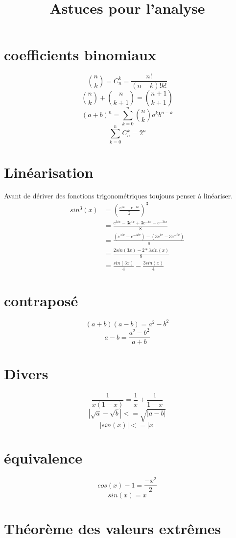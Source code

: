 \documentclass[a4paper,10pt]{article}
\title{Astuces pour l'analyse}
\author{}
\begin{document}
\maketitle

\begin{abstract}

\end{abstract}
\section{coefficients binomiaux}
\[\textstyle{n \choose k} = C^{k}_{n} = \frac{n!}{(n - k)!k!}\]
\[\textstyle{n \choose k} + \textstyle{n \choose k + 1} = \textstyle{n + 1 \choose k + 1}\]
\[(a + b)^{n} = \sum_{k = 0}^{n} \textstyle{n \choose k} a^{k}b^{n - k}\]
\[\sum_{k = 0}^{n} C^{k}_{n} = 2^{n}\]

\section{Linéarisation}
Avant de dériver des fonctions trigonométriques toujours penser à linéariser.
\begin{align*}
sin^{3}(x) &= (\frac{e^{ix} - e^{-ix}}{2})^{3}\\
&= \frac{e^{3ix} - 3e^{ix} + 3e^{-ix} - e^{-3ix}}{8}\\
&= \frac{(e^{3ix} - e^{-3ix}) -(3e^{ix} - 3e^{-ix})}{8}\\
&= \frac{2sin(3x) - 2*3sin(x)}{8}\\
&= \frac{sin(3x)}{4} - \frac{3sin(x)}{4}
\end{align*}
\section{contraposé}
\[(a + b)(a - b) = a^{2} - b^{2}\]
\[a - b = \frac{a^{2} - b^{2}}{a + b}\]
\section{Divers}
\[\frac{1}{x(1 - x)} = \frac{1}{x} + \frac{1}{1 - x}\]
\[|\sqrt{a} - \sqrt{b}| <= \sqrt{|a - b|}\]
\[|sin(x)| <= |x|\]
\section{équivalence}
\[cos(x) - 1 = \frac{-x^2}{2}\]
\[sin(x) = x\]
\section[Aussi nommé Théorème de Weierstrass.]{Théorème des valeurs extrêmes}
\end{document}
